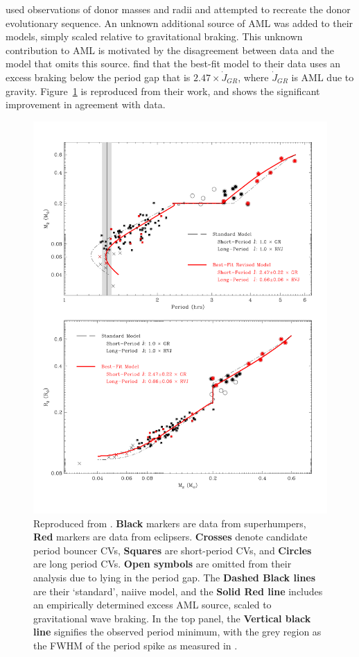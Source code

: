 \citet{knigge11} used observations of donor masses and radii and attempted to recreate the donor evolutionary sequence.
An unknown additional source of AML was added to their models, simply scaled relative to gravitational braking. This unknown contribution to AML is motivated by the disagreement between data and the model that omits this source. \citet{knigge11} find that the best-fit model to their data uses an excess braking below the period gap that is $2.47 \times \dot J_{GR}$, where $\dot J_{GR}$ is AML due to gravity. Figure~\ref{fig:introduction:Knigge 2011 figure 9} is reproduced from their work, and shows the significant improvement in agreement with data.
\begin{figure}
    \centering
    \includegraphics[width=\textwidth, trim={0 2cm 0 2cm}]{figures/introduction/Knigge11_fig9.pdf}
    \caption{Reproduced from \citet{knigge11}. {\bf Black} markers are data from superhumpers, {\bf Red} markers are data from eclipsers. {\bf Crosses} denote candidate period bouncer CVs, {\bf Squares} are short-period CVs, and {\bf Circles} are long period CVs. {\bf Open symbols} are omitted from their analysis due to lying in the period gap. The {\bf Dashed Black lines} are their `standard', naiive model, and the {\bf Solid Red line} includes an empirically determined excess AML source, scaled to gravitational wave braking. In the top panel, the {\bf Vertical black line} signifies the observed period minimum, with the grey region as the FWHM of the period spike as measured in \citet{gaensicke2009}.}
    \label{fig:introduction:Knigge 2011 figure 9}
\end{figure}

